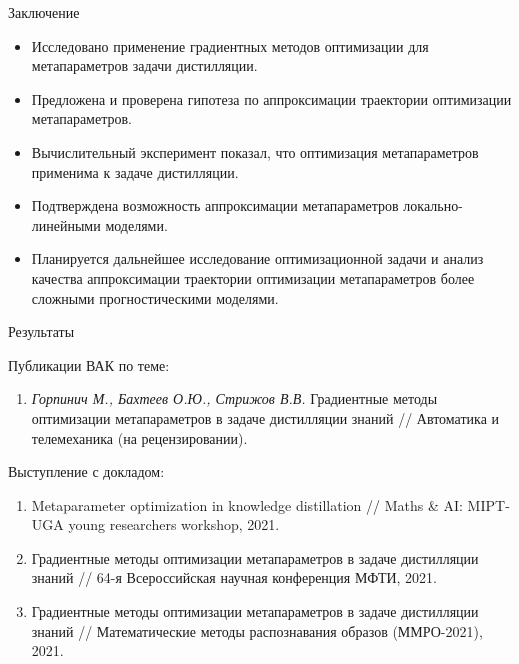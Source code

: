 \documentclass[12pt, aspectratio=169]{beamer}
\begin{document}
\begin{frame}{Заключение}
    \begin{itemize}
        \item Исследовано применение градиентных методов оптимизации для метапараметров задачи дистилляции. 
        \item Предложена и проверена гипотеза по аппроксимации траектории оптимизации метапараметров. 
        \item Вычислительный эксперимент показал, что оптимизация метапараметров применима к задаче дистилляции. 
        \item Подтверждена возможность аппроксимации метапараметров локально-линейными моделями. 
        \item Планируется дальнейшее исследование оптимизационной задачи и анализ качества  аппроксимации траектории оптимизации метапараметров более сложными прогностическими моделями.
    \end{itemize}
\end{frame}


\begin{frame}{Результаты}

Публикации ВАК по теме:

\begin{enumerate}
    \item \textit{Горпинич М., Бахтеев О.Ю., Стрижов В.В.} Градиентные методы оптимизации метапараметров в задаче дистилляции знаний // Автоматика и телемеханика (на рецензировании).
\end{enumerate}

Выступление с докладом:
    
\begin{enumerate}
    \item Metaparameter optimization in knowledge distillation // Maths \& AI: MIPT-UGA young researchers workshop, 2021.
    \item Градиентные методы оптимизации метапараметров в задаче дистилляции знаний // 64-я Всероссийская научная конференция МФТИ, 2021.
    \item Градиентные методы оптимизации метапараметров в задаче дистилляции знаний // Математические методы распознавания образов (ММРО-2021), 2021.
\end{enumerate}



\end{frame}
\end{document}
